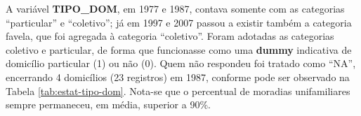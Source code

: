 %

\clearpage
A variável \textbf{TIPO_DOM}, em 1977 e 1987, contava somente com as categorias ``particular'' e ``coletivo''; já em 1997 e 2007 passou a existir também a categoria favela, que foi agregada à categoria ``coletivo''. Foram adotadas as categorias coletivo e particular, de forma que funcionasse como uma \textbf{dummy} indicativa de domicílio particular (1) ou não (0). Quem não respondeu foi tratado como ``NA'', encerrando 4 domicílios (23 registros) em 1987, conforme pode ser observado na Tabela \ref{tab:estat-tipo-dom}. Nota-se que o percentual de moradias unifamiliares sempre permaneceu, em média, superior a 90\%.

